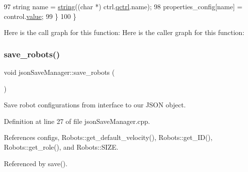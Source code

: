 \begin{DoxyCode}
97         \textcolor{keywordtype}{string} name = \hyperlink{namespacenlohmann_1_1detail_a1ed8fc6239da25abcaf681d30ace4985ab45cffe084dd3d20d928bee85e7b0f21}{string}((\textcolor{keywordtype}{char} *) ctrl.\hyperlink{struct_v_s_s_s___g_u_i_1_1____ctrl__holder_ab215a49cfe0350894f78df2243fd0148}{qctrl}.name);
98         properties\_config[name] = control.\hyperlink{classnlohmann_1_1basic__json_adcf8ca5079f5db993820bf50036bf45d}{value};
99     \}
100 \}
\end{DoxyCode}
Here is the call graph for this function\+:
Here is the caller graph for this function\+:
\mbox{\label{classjson_save_manager_ad5acf46f5a0620389055c16c3faa2519}} 
\subsubsection{\texorpdfstring{save\+\_\+robots()}{save\_robots()}}
{\footnotesize\ttfamily void json\+Save\+Manager\+::save\+\_\+robots (\begin{DoxyParamCaption}{ }\end{DoxyParamCaption})}



Save robot configurations from interface to our J\+S\+ON object. 



Definition at line 27 of file json\+Save\+Manager.\+cpp.



References configs, Robots\+::get\+\_\+default\+\_\+velocity(), Robots\+::get\+\_\+\+I\+D(), Robots\+::get\+\_\+role(), and Robots\+::\+S\+I\+ZE.



Referenced by save().


